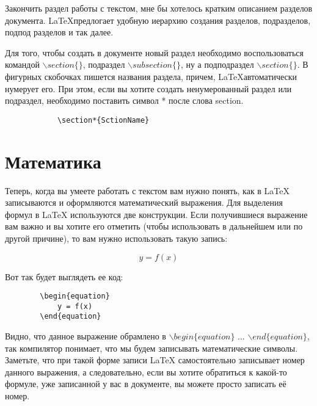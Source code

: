     Закончить раздел работы с текстом, мне бы хотелось кратким описанием разделов документа.
    \LaTeX предлогает удобную иерархию создания разделов, подразделов, подпод разделов и так далее.
    
    Для того, чтобы создать в документе новый раздел необходимо воспользоваться
    командой $\backslash section\{\}$, подраздел $\backslash subsection\{\}$,
    ну а подподраздел $\backslash section\{\}$. В фигурных скобочках пишется названия раздела,
    причем, \LaTeX автоматически нумерует его. При этом, если вы хотите создать ненумерованный
    раздел или подраздел, необходимо поставить символ * после слова section.

    \begin{center}
        \begin{verbatim}
            \section*{SctionName}
        \end{verbatim}
    \end{center}

    \section{Математика}

    Теперь, когда вы умеете работать с текстом вам нужно понять, как в \LaTeX{} записываются и оформляются математический выражения. Для выделения формул в \LaTeX{} используются две конструкции. Если получившиеся выражение вам важно и вы хотите его отметить (чтобы использовать в дальнейшем или по другой причине), то вам нужно использовать такую запись:

    \begin{equation}
        y = f(x)
    \end{equation}
    
    Вот так будет выглядеть ее код:    
    
    \begin{verbatim}
        \begin{equation}
            y = f(x)
        \end{equation}
    \end{verbatim}   
    
    Видно, что данное выражение обрамлено в $\backslash begin\{equation\}$ ... $\backslash end\{equation\}$, так компилятор понимает, что мы будем записывать математические символы. Заметьте, что при такой форме записи \LaTeX{} самостоятельно записывает номер данного выражения, а следовательно, если вы хотите обратиться к какой-то формуле, уже записанной у вас в документе, вы можете просто записать её номер.
    
